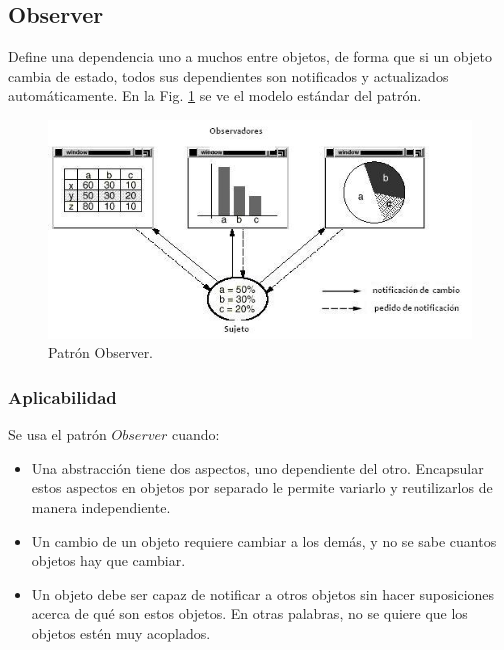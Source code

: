 		\subsection{Observer}\label{patron_observer}
			Define una dependencia uno a muchos entre objetos, de forma que si un objeto cambia de estado, todos sus dependientes son notificados y 
			actualizados autom\'aticamente.
			En la Fig. \ref{pattern_observer} se ve el modelo est\'andar del patr\'on.
	 		\begin{figure}[ht]
				\centering
				\includegraphics[scale=0.8]{images/pattern_observer.jpg}
				\caption{Patr\'on Observer.} \label{pattern_observer}
			\end{figure}

	    	\subsubsection{Aplicabilidad}
	    	Se usa el patr\'on $Observer$ cuando: 
		    \begin{itemize}
    			\item Una abstracci\'on tiene dos aspectos, uno dependiente del otro. Encapsular estos aspectos en objetos por separado le permite variarlo y 
    			reutilizarlos de manera independiente.
			    \item Un cambio de un objeto requiere cambiar a los dem\'as, y no se sabe cuantos objetos hay que cambiar.
				\item Un objeto debe ser capaz de notificar a otros objetos sin hacer suposiciones acerca de qu\'e son estos objetos. En otras palabras, no se 
				quiere que los objetos est\'en muy acoplados.
		    \end{itemize}
